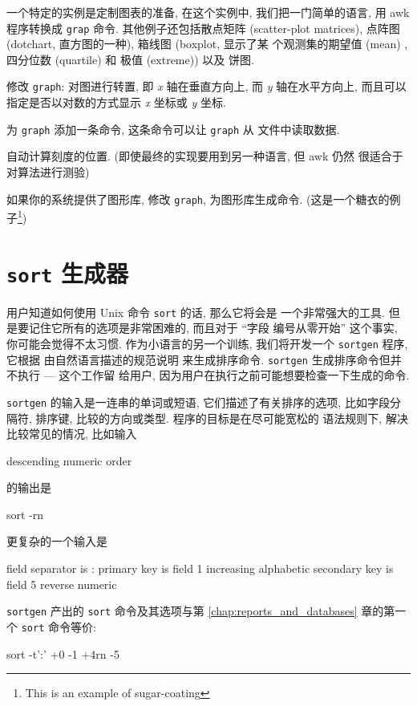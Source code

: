 一个特定的实例是定制图表的准备, 在这个实例中, 我们把一门简单的语言, 用
awk 程序转换成 \texttt{grap} 命令. 其他例子还包括散点矩阵 (scatter-plot
matrices), 点阵图 (dotchart, 直方图的一种), 箱线图 (boxplot, 显示了某
个观测集的期望值 (mean) , 四分位数 (quartile) 和 极值 (extreme)) 以及
饼图.

\begin{exercise}
    \label{exer:zhuangzhi}
    修改 \texttt{graph}: 对图进行转置, 即 \textit{x} 轴在垂直方向上,
    而 \textit{y} 轴在水平方向上, 而且可以指定是否以对数的方式显示
    \textit{x} 坐标或 \textit{y} 坐标.
\end{exercise}

\begin{exercise}
    为 \texttt{graph} 添加一条命令, 这条命令可以让 \texttt{graph} 从
    文件中读取数据.
\end{exercise}

\begin{exercise}
    自动计算刻度的位置. (即使最终的实现要用到另一种语言, 但 awk 仍然
    很适合于对算法进行测验)
\end{exercise}

\begin{exercise}
    如果你的系统提供了图形库, 修改 \texttt{graph}, 为图形库生成命令.
    (这是一个糖衣的例子\footnote{This is an example of sugar-coating})
\end{exercise}

\section{\textbf{\texttt{sort}} 生成器}
\label{sec:a_sort_generator}

 用户知道如何使用 Unix 命令 \texttt{sort} 的话, 那么它将会是
一个非常强大的工具. 但是要记住它所有的选项是非常困难的, 而且对于 ``字段
编号从零开始'' 这个事实, 你可能会觉得不太习惯. 作为小语言的另一个训练,
我们将开发一个 \texttt{sortgen} 程序, 它根据 由自然语言描述的规范说明
来生成排序命令. \texttt{sortgen} 生成排序命令但并不执行 --- 这个工作留
给用户, 因为用户在执行之前可能想要检查一下生成的命令.

\texttt{sortgen} 的输入是一连串的单词或短语, 它们描述了有关排序的选项,
比如字段分隔符, 排序键, 比较的方向或类型. 程序的目标是在尽可能宽松的
语法规则下, 解决比较常见的情况, 比如输入
\begin{file}
    descending numeric order
\end{file}
的输出是
\begin{shell}
    sort -rn
\end{shell}
更复杂的一个输入是
\begin{file}
    field separator is :
    primary key is field 1
        increasing alphabetic
    secondary key is field 5
        reverse numeric
\end{file}
\texttt{sortgen} 产出的 \texttt{sort} 命令及其选项与第
\ref{chap:reports_and_databases} 章的第一个 \texttt{sort} 命令等价:
\begin{shell}
    sort -t':' +0 -1 +4rn -5
\end{shell}

